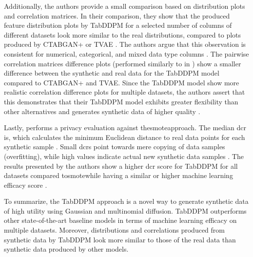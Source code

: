 Additionally, the authors provide a small comparison based on distribution plots and correlation matrices.
In their comparison, they show that the produced feature distribution plots by TabDDPM for a selected number of columns of different datasets look more similar 
to the real distributions, compared to plots produced by CTABGAN+ or TVAE \cite{kotelnikov2022TabDDPMModellingTabular}.
The authors argue that this observation is consistent for numerical, categorical, and mixed data type columns \cite{kotelnikov2022TabDDPMModellingTabular}.
The pairwise correlation matrices difference plots (performed similarly to in \cite{brenninkmeijer2019GenerationEvaluationTabular}) show a smaller difference between the synthetic and real data for the TabDDPM model compared to CTABGAN+ and TVAE.
Since the TabDDPM model show more realistic correlation difference plots for multiple datasets, 
the authors assert that this demonstrates that their TabDDPM model exhibits greater flexibility than other alternatives and generates synthetic data of higher quality \cite{kotelnikov2022TabDDPMModellingTabular}.

Lastly, \cite{kotelnikov2022TabDDPMModellingTabular} performs a privacy evaluation against the\gls{smote}approach.
The median \gls{dcr} is, which calculates the minimum Euclidean distance to real data points for each synthetic sample \cite{zhao2021CTABGANEffectiveTable}.
Small \glspl{dcr} point towards mere copying of data samples (overfitting), while high values indicate actual new synthetic data samples \cite{kotelnikov2022TabDDPMModellingTabular}.
The results presented by the authors show a higher \gls{dcr} score for TabDDPM for all datasets compared to\gls{smote}while having a similar or higher machine learning efficacy score \cite{kotelnikov2022TabDDPMModellingTabular}.

To summarize, the TabDDPM approach is a novel way to generate synthetic data of high utility using Gaussian and multinomial diffusion.
TabDDPM outperforms other state-of-the-art baseline models in terms of machine learning efficacy on multiple datasets.
Moreover, distributions and correlations produced from synthetic data by TabDDPM look more similar to those of the real data than synthetic data produced by other models.





